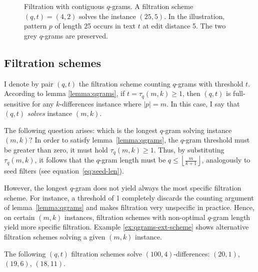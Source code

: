 \begin{figure}[h]
\begin{center}
\caption[Filtration with contiguous $q$-grams]{Filtration with contiguous $q$-grams. A filtration scheme $(q,t) = (4,2)$ solves the instance $(25,5)$. In the illustration, pattern $p$ of length 25 occurs in text $t$ at edit distance 5. The two grey $q$-grams are preserved.}
\label{fig:qgrams-ext}

\end{center}
\end{figure}

\subsection{Filtration schemes}

I denote by pair $(q,t)$ the filtration scheme counting $q$-grams with threshold $t$.
According to lemma \ref{lemma:qgrams}, if $t = \tau_q(m,k) \geq 1$, then $(q,t)$ is full-sensitive for any $k$-differences instance where $|p|=m$.
In this case, I say that $(q,t)$ \emph{solves} instance $(m,k)$.

The following question arises: which is the longest $q$-gram solving instance $(m,k)$?
In order to satisfy lemma~\ref{lemma:qgrams}, the $q$-gram threshold must be greater than zero, \ie it must hold $\tau_q(m,k) \geq 1$.
Thus, by substituting $\tau_q(m,k)$, it follows that the $q$-gram length must be $q \leq \left \lfloor \frac{m}{k+1} \right \rfloor$, analogously to seed filters (see equation~\ref{eq:seed-len}).

However, the longest $q$-gram does not yield always the most specific filtration scheme.
For instance, a threshold of 1 completely discards the counting argument of lemma~\ref{lemma:qgrams} and makes filtration very unspecific in practice.
Hence, on certain $(m,k)$ instances, filtration schemes with non-optimal $q$-gram length yield more specific filtration.
Example \ref{ex:qgrams-ext-scheme} shows alternative filtration schemes solving a given $(m,k)$ instance.

\begin{example}
\label{ex:qgrams-ext-scheme}
The following $(q,t)$ filtration schemes solve $(100,4)$-differences:
$(20,1)$, $(19,6)$, $(18,11)$.
\end{example}

